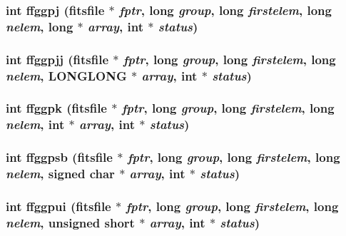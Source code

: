 \subsubsection{\setlength{\rightskip}{0pt plus 5cm}int ffggpj (\bf{fitsfile} $\ast$ {\em fptr}, long {\em group}, long {\em firstelem}, long {\em nelem}, long $\ast$ {\em array}, int $\ast$ {\em status})}\label{src_2fitsio_8h_99232aa89514e1335fced48812badbd8}


\subsubsection{\setlength{\rightskip}{0pt plus 5cm}int ffggpjj (\bf{fitsfile} $\ast$ {\em fptr}, long {\em group}, long {\em firstelem}, long {\em nelem}, \bf{LONGLONG} $\ast$ {\em array}, int $\ast$ {\em status})}\label{src_2fitsio_8h_76b52ae73ab6d4139c2f8289663511c2}


\subsubsection{\setlength{\rightskip}{0pt plus 5cm}int ffggpk (\bf{fitsfile} $\ast$ {\em fptr}, long {\em group}, long {\em firstelem}, long {\em nelem}, int $\ast$ {\em array}, int $\ast$ {\em status})}\label{src_2fitsio_8h_09f7024b2b7c61b65c69753195f596e2}


\subsubsection{\setlength{\rightskip}{0pt plus 5cm}int ffggpsb (\bf{fitsfile} $\ast$ {\em fptr}, long {\em group}, long {\em firstelem}, long {\em nelem}, signed char $\ast$ {\em array}, int $\ast$ {\em status})}\label{src_2fitsio_8h_be4013a55c9a0fc0e0c4bb9708709d9a}


\subsubsection{\setlength{\rightskip}{0pt plus 5cm}int ffggpui (\bf{fitsfile} $\ast$ {\em fptr}, long {\em group}, long {\em firstelem}, long {\em nelem}, unsigned short $\ast$ {\em array}, int $\ast$ {\em status})}\label{src_2fitsio_8h_34d6ece27ce372694fbd813123a5e5be}


